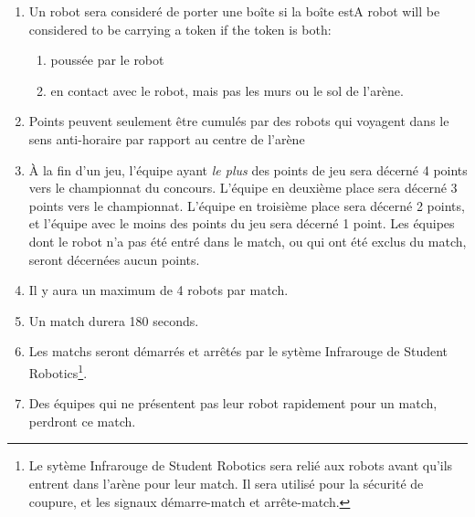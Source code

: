 \begin{enumerate}
\item Un robot sera consideré de porter une boîte si la boîte estA robot will be considered to be carrying a token if the token is both:
  \begin{enumerate}
  \item poussée par le robot
  \item en contact avec le robot, mais pas les murs ou le sol de l'arène.
  \end{enumerate}

\item Points peuvent seulement être cumulés par des robots qui voyagent dans le sens anti-horaire par rapport au centre de l'arène

\item À la fin d'un jeu, l'équipe ayant \emph{le plus} des points de jeu sera décerné 4 points vers le championnat du concours.
 L'équipe en deuxième place sera décerné 3 points vers le championnat.
 L'équipe en troisième place sera décerné 2 points, et l'équipe avec le moins des points du jeu sera décerné 1 point.
 Les équipes dont le robot n'a pas été entré dans le match, ou qui ont été exclus du match, seront décernées aucun points.

\item Il y aura un maximum de 4 robots par match.
\item Un match durera 180 seconds.
\item Les matchs seront démarrés et arrêtés par le sytème Infrarouge de Student Robotics\footnote{Le sytème Infrarouge de Student Robotics sera relié aux robots avant qu'ils entrent dans l'arène pour leur match. Il sera utilisé pour la sécurité de coupure, et les signaux démarre-match et arrête-match.}.
\item Des équipes qui ne présentent pas leur robot rapidement pour un match, perdront ce match.
\end{enumerate}
